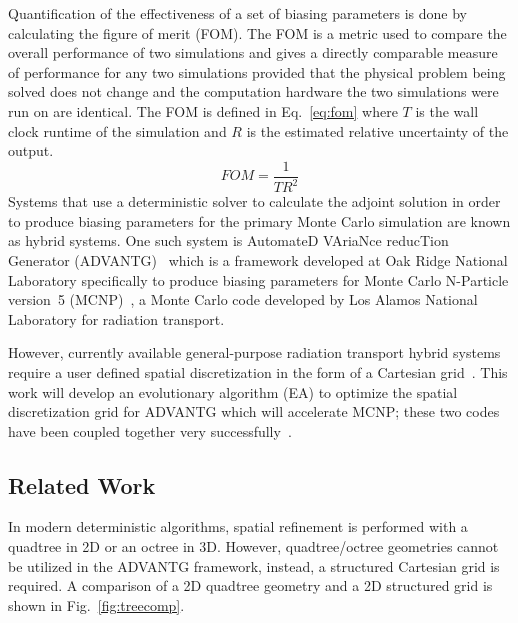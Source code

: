 \documentclass{article}
\begin{document}
Quantification of the effectiveness of a set of biasing parameters is done by calculating the figure of merit (FOM). The FOM is a metric used to compare the overall performance of two simulations and gives a directly comparable measure of performance for any two simulations provided that the physical problem being solved does not change and the computation hardware the two simulations were run on are identical. The FOM is defined in Eq.~\ref{eq:fom} where $T$ is the wall clock runtime of the simulation and $R$ is the estimated relative uncertainty of the output.
\begin{equation} \label{eq:fom}
FOM = \frac{1}{T R^2}
\end{equation}
Systems that use a deterministic solver to calculate the adjoint solution in order to produce biasing parameters for the primary Monte Carlo simulation are known as hybrid systems. One such system is AutomateD VAriaNce reducTion Generator (ADVANTG)~\cite{ref:Mosher2015} which is a framework developed at Oak Ridge National Laboratory specifically to produce biasing parameters for Monte Carlo N-Particle version~5 (MCNP)~\cite{ref:X5}, a Monte Carlo code developed by Los Alamos National Laboratory for radiation transport. 

However, currently available general-purpose radiation transport hybrid systems require a user defined spatial discretization in the form of a Cartesian grid~\cite{ref:Wagner2014, ref:Mosher2015}. This work will develop an evolutionary algorithm (EA) to optimize the spatial discretization grid for ADVANTG which will accelerate MCNP; these two codes have been coupled together very successfully~\cite{ref:Blakeman2007, ref:Risner2013, ref:Ibrahim2011, ref:Wagner2011}.



\subsection{Related Work}\label{sec:b2}
In modern deterministic algorithms, spatial refinement is performed with a quadtree in 2D or an octree in 3D. However, quadtree/octree geometries cannot be utilized in the ADVANTG framework, instead, a structured Cartesian grid is required. A comparison of a 2D quadtree geometry and a 2D structured grid is shown in Fig.~\ref{fig:treecomp}. 
\end{document}
